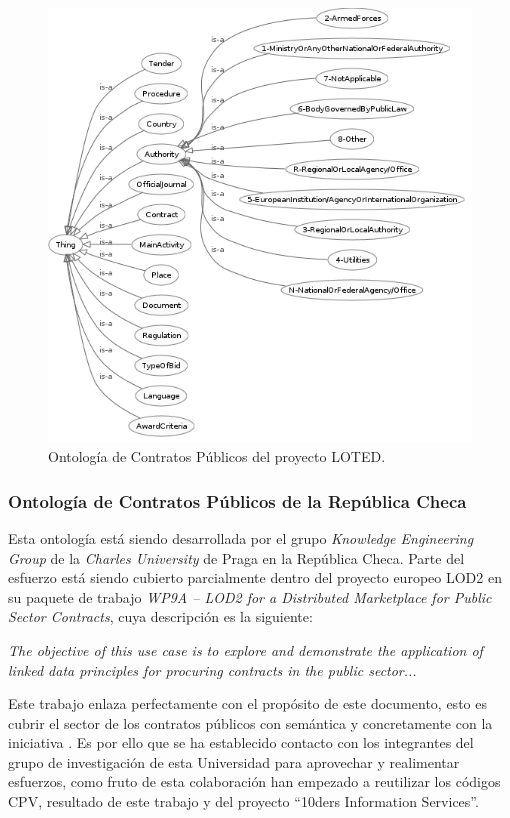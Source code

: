 \begin{figure}[h]
 \centering
    \includegraphics[width=14cm]{images/phd/loted-ontology}
  \caption{Ontología de Contratos Públicos del proyecto LOTED.}
 \label{fig:public-contracts-ontology-loted}
\end{figure}

\subsubsection{Ontología de Contratos Públicos de la República Checa}
Esta ontología está siendo desarrollada por el grupo \textit{Knowledge Engineering Group} 
de la \textit{Charles University} de Praga en la República Checa. Parte del esfuerzo está siendo
cubierto parcialmente dentro del proyecto europeo LOD2 en su paquete de trabajo \textit{WP9A – LOD2 for a Distributed Marketplace for Public Sector Contracts}, cuya descripción es la siguiente:

\begin{Frame}
\textit{The objective of this use case is to explore and demonstrate the application of linked data principles for procuring contracts in the public sector...}
\end{Frame}

Este trabajo enlaza perfectamente con el propósito de este documento, esto es cubrir el sector de los contratos
públicos con semántica y concretamente con la iniciativa \linkeddata. Es por ello que se ha establecido
contacto con los integrantes del grupo de investigación de esta Universidad para aprovechar y realimentar
esfuerzos, como fruto de esta colaboración han empezado a reutilizar los códigos CPV, resultado de este trabajo y del proyecto ``10ders Information Services''.

